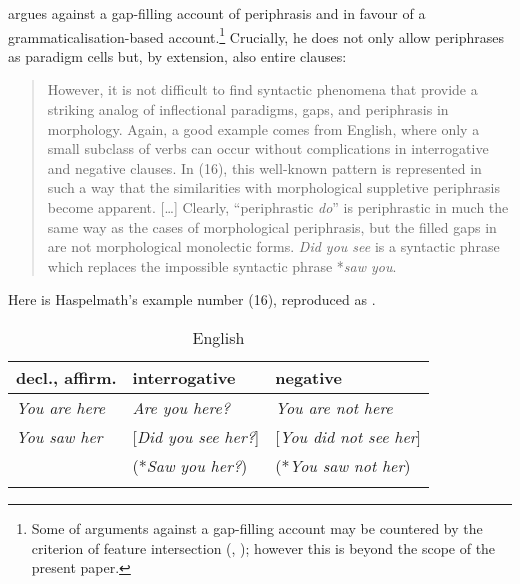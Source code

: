 \documentclass[output=paper]{langsci/langscibook}
\begin{document}
\citet{Haspelmath2000} argues against a gap-filling account of periphrasis and in favour of a grammaticalisation-based account.\footnote{Some of  arguments against a gap-filling account may be countered by the criterion of feature intersection (\citealt[250--252]{BrownBrown2012}, \citealt{Reiner2020}); however this is beyond the scope of the present paper.} Crucially, he does not only allow periphrases as paradigm cells but, by extension, also entire clauses:

\begin{quote}
However, it is not difficult to find syntactic phenomena that provide a striking analog of inflectional paradigms, gaps, and periphrasis in morphology. Again, a good example comes from English, where only a small subclass of verbs can occur without complications in interrogative and negative clauses. In (16), this well-known pattern is represented in such a way that the similarities with morphological suppletive periphrasis become apparent. […] Clearly, “periphrastic \textit{do}” is periphrastic in much the same way as the cases of morphological periphrasis, but the filled gaps in  are not morphological monolectic forms. \textit{Did you see} is a syntactic phrase which replaces the impossible syntactic phrase *\textit{saw you}. \citep[662]{Haspelmath2000}
\end{quote}

Here is Haspelmath’s example number (16), reproduced as .



\begin{table}
\caption{English \citep[662]{Haspelmath2000}\label{tab:reiner:e20}}
\begin{tabular}{lll}
\lsptoprule
decl., affirm. & interrogative & negative\\
\midrule
\textit{You are here} & \textit{Are you here?} & \textit{You are not here}\\
\textit{You saw her} & [\textit{Did you see her?}] & [\textit{You did not see her}]\\
& (*\textit{Saw you her?}) & (*\textit{You saw not her})\\
\lspbottomrule
\end{tabular}
\end{table}
\end{document}
